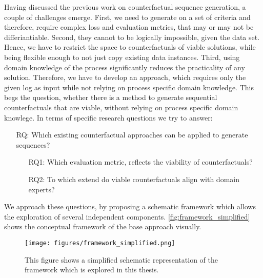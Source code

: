 \documentclass[./../../paper.tex]{subfiles}
\begin{document}
Having discussed the previous work on counterfactual sequence generation, a couple of challenges emerge. 
First, we need to generate on a set of criteria and therefore, require complex loss and evaluation metrics, that may or may not be differiantiable. Second, they cannot to be logically impossible, given the data set. 
Hence, we have to restrict the space to counterfactuals of viable solutions, while being flexible enough to not just copy existing data instances. 
Third, using domain knowledge of the process significantly reduces the practicality of any solution. Therefore, we have to develop an approach, which requires only the given log as input while not relying on process specific domain knowledge. This begs the question, whether there is a method to generate sequential counterfactuals that are viable, without relying on process specific domain knowlege. In terms of specific research questions we try to answer:

\begin{itemize}
    \item[RQ:] Which existing counterfactual approaches can be applied to generate sequences?
    \begin{itemize}
        \item[RQ1:] Which evaluation metric, reflects the viability of counterfactuals?
        \item[RQ2:] To which extend do viable counterfactuals align with domain experts?  
    \end{itemize}
\end{itemize}

\noindent We approach these questions, by proposing a schematic framework which allows the exploration of several independent components. \autoref{fig:framework_simplified} shows the conceptual framework of the base approach visually.

\begin{figure}[htb]
    \label{fig:framework_simplified}
    \centering
    \texttt{[image: figures/framework\_simplified.png]}
    \caption{This figure shows a simplified schematic representation of the framework which is explored in this thesis.}
\end{figure}
\end{document}
